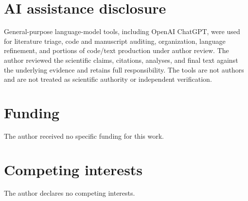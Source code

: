 \documentclass[11pt]{article}
\begin{document}















\section*{AI assistance disclosure}
General-purpose language-model tools, including OpenAI ChatGPT, were used for literature triage, code and manuscript auditing, organization, language refinement, and portions of code/text production under author review. The author reviewed the scientific claims, citations, analyses, and final text against the underlying evidence and retains full responsibility. The tools are not authors and are not treated as scientific authority or independent verification.

\section*{Funding}
The author received no specific funding for this work.

\section*{Competing interests}
The author declares no competing interests.

\end{document}
